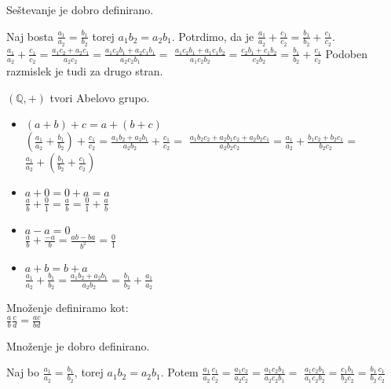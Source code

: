 \begin{trditev}
    Seštevanje je dobro definirano.
\end{trditev}
\begin{dokaz}
    Naj bosta $\frac{a_1}{a_2} = \frac{b_1}{b_2}$ torej $a_1 b_2 = a_2 b_1$.
    Potrdimo, da je $\frac{a_1}{a_2} + \frac{c_1}{c_2} = \frac{b_1}{b_2} + \frac{c_1}{c_2}$.
    $\frac{a_1}{a_2} + \frac{c_1}{c_2} = \frac{a_1 c_2 + a_2 c_1}{a_2 c_2} = \frac{a_1 c_2 b_1 + a_2 c_1 b_1}{a_2 c_2 b_1} =$
    $\frac{a_1 c_2 b_1 + a_1 c_1 b_2}{a_1 c_2 b_2} = \frac{c_2 b_1 + c_1 b_2}{c_2 b_2} = \frac{b_1}{b_2} + \frac{c_1}{c_2}$
    Podoben razmislek je tudi za drugo stran.
\end{dokaz}

\begin{trditev}
    $(\mathbb{Q}, +)$ tvori Abelovo grupo.
\end{trditev}
\begin{dokaz}
    \begin{itemize}
        \item $(a + b) + c = a + (b + c)$ \\
        $\left(\frac{a_1}{a_2} + \frac{b_1}{b_2}\right) + \frac{c_1}{c_2} = \frac{a_1 b_2 + a_2 b_1}{a_2 b_2} + \frac{c_1}{c_2} = $
        $\frac{a_1 b_2 c_2 + a_2 b_1 c_2 + a_2 b_2 c_1}{a_2 b_2 c_2} = \frac{a_1}{a_2} + \frac{b_1 c_2 + b_2 c_1}{b_2 c_2} =$
        $\frac{a_1}{a_2} + \left(\frac{b_1}{b_2} + \frac{c_1}{c_2}\right)$
        \item $a + 0 = 0 + a = a$ \\
        $\frac{a}{b} + \frac{0}{1} = \frac{a}{b} = \frac{0}{1} + \frac{a}{b}$
        \item $a - a = 0$ \\
        $\frac{a}{b} + \frac{-a}{b} = \frac{ab - ba}{b^2} = \frac{0}{1}$
        \item $a + b = b + a$ \\
        $\frac{a_1}{a_2} + \frac{b_1}{b_2} = \frac{a_1 b_2 + a_2 b_1}{a_2 b_2} = \frac{b_1}{b_2} + \frac{a_1}{a_2}$
    \end{itemize}
\end{dokaz}

\begin{definicija}
    Množenje definiramo kot: \\
    $\frac{a}{b}\frac{c}{d} = \frac{ac}{bd}$
\end{definicija}

\begin{trditev}
    Množenje je dobro definirano.
\end{trditev}
\begin{dokaz}
    Naj bo $\frac{a_1}{a_2} = \frac{b_1}{b_2}$, torej $a_1 b_2 = a_2 b_1$.
    Potem $\frac{a_1}{a_2} \frac{c_1}{c_2} = \frac{a_1 c_2}{a_2 c_2} = \frac{a_1 c_2 b_1}{a_2 c_2 b_1} = $
    $\frac{a_1 c_2 b_1}{a_1 c_2 b_2} = \frac{c_1 b_1}{b_2 c_2} = \frac{b_1}{b_2} \frac{c_1}{c_2}$
\end{dokaz}
